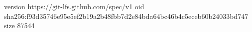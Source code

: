 version https://git-lfs.github.com/spec/v1
oid sha256:f93d35746e95e5ef2b19a2b48fbb7d2e84bda64bc46b4c5eceb60b24033bd747
size 87544

